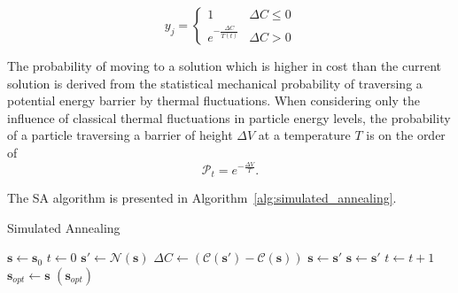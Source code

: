 \documentclass[11pt]{afthesis}
\begin{document}
	\begin{equation} 
	y_j = \begin{cases}
	1 &\Delta C   \leq 0 \\
	e^{-\frac{\Delta C}{T(t)}} & \Delta C > 0 
	\end{cases}
	\end{equation}

	
	The probability of moving to a solution which is higher in cost than the current solution is derived from the statistical mechanical probability of traversing a potential energy barrier by thermal fluctuations. When considering only the influence of classical thermal fluctuations in particle energy levels, the probability of a particle traversing a barrier of height \begin{math} \Delta V \end{math} at a temperature \begin{math} T \end{math} is on the order of \begin{equation} 
	\mathcal{P}_t = e^{-\frac{\Delta V}{T}} .
	\label{eq:thermal_traversal_prob}
	\end{equation}
	
	The SA algorithm is presented in Algorithm~\ref{alg:simulated_annealing}. 



	
	\begin{algorithm}
		\caption{Simulated Annealing}
		\label{alg:simulated_annealing}
		\begin{algorithmic}
			\STATE $\boldsymbol{s} \leftarrow \boldsymbol{s}_0$
			\STATE $t \leftarrow 0$
			\STATE $\boldsymbol{s}' \leftarrow \boldsymbol{\mathcal{N}}(\boldsymbol{s}) $
			\STATE $\Delta C \leftarrow (\mathcal{C}(\boldsymbol{s}')-\mathcal{C}(\boldsymbol{s}))$
			\STATE $\boldsymbol{s} \leftarrow \boldsymbol{s}'$
			\STATE $\boldsymbol{s} \leftarrow \boldsymbol{s}'$
			\ENDIF
			\STATE $t \leftarrow t+1$
			\ENDWHILE
			\STATE $\boldsymbol{s}_{opt} \leftarrow \boldsymbol{s}$
			\RETURN $(\boldsymbol{s}_{opt})$
		\end{algorithmic}
	\end{algorithm}
		
	
\end{document}
